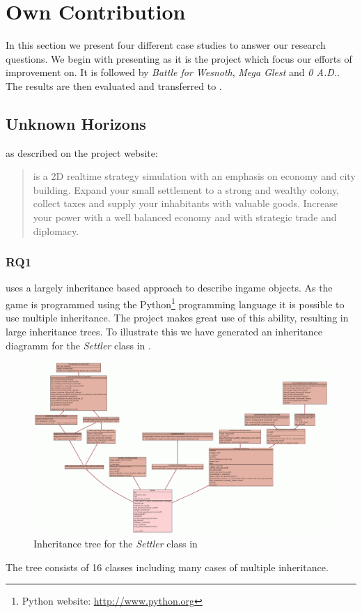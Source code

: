 \section{Own Contribution}
In this section we present four different case studies to answer our research questions. We begin with presenting
\UH{} as it is the project which focus our efforts of improvement on. It is followed by \textit{Battle for
Wesnoth}, \textit{Mega Glest} and \textit{0 A.D.}.
The results are then evaluated and transferred to \UH{}.

\subsection{Unknown Horizons}
\UH{} as described on the project website:
\begin{quote}
\UH{} is a 2D realtime strategy simulation with an emphasis on economy and city building. Expand your small settlement to a strong and wealthy colony, collect taxes and supply your inhabitants with valuable goods. Increase your power with a well balanced economy and with strategic trade and diplomacy.
\end{quote}

\subsubsection{RQ1}
\UH{} uses a largely inheritance based approach to describe ingame objects. As the game is programmed using
the Python\footnote{Python website: \url{http://www.python.org}} programming language it is possible to use multiple
inheritance. The project makes great use of this ability, resulting in large inheritance trees. To illustrate this we
have generated an inheritance diagramm for the \textit{Settler} class in . 
\begin{figure}[!htb]
\includegraphics[angle=90,scale=0.25]{pics/settler_uml}
\caption{Inheritance tree for the \textit{Settler} class in \UH{}}
\label{fig:settleruml}
\end{figure}
The tree consists of 16 classes including many cases of multiple inheritance. 

